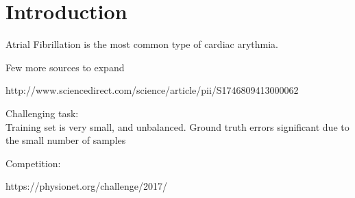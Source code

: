 \section{Introduction}


Atrial Fibrillation is the most common type of cardiac arythmia.

Few more sources to expand

http://www.sciencedirect.com/science/article/pii/S1746809413000062


Challenging task: \\
Training set is very small, and unbalanced.
Ground truth errors significant due to the small number of samples


Competition:

https://physionet.org/challenge/2017/
